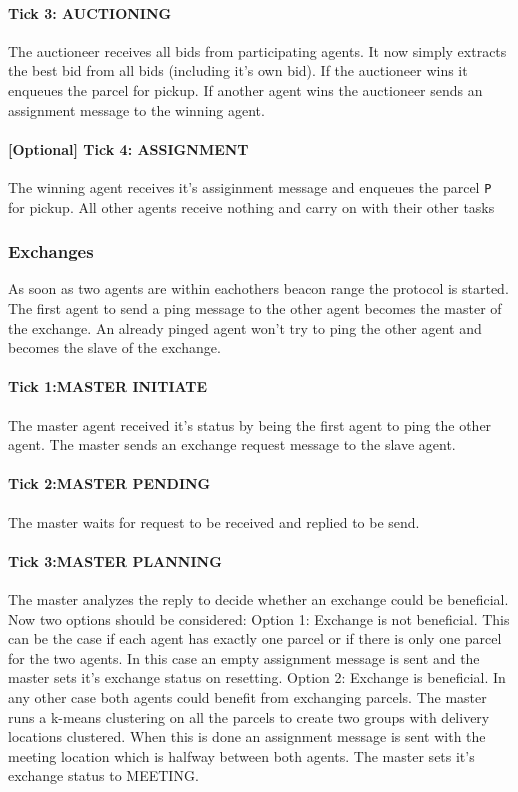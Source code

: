 \documentclass[../main.tex]{subfiles}
\begin{document}
\paragraph{Tick 3: AUCTIONING}
The auctioneer receives all bids from participating agents.
It now simply extracts the best bid from all bids (including it's own bid).
If the auctioneer wins it enqueues the parcel for pickup.
If another agent wins the auctioneer sends an assignment message to the winning agent.
\paragraph{[Optional] Tick 4: ASSIGNMENT}
The winning agent receives it's assiginment message and enqueues the parcel \texttt{P} for pickup.
All other agents receive nothing and carry on with their other tasks

\subsubsection{Exchanges}

As soon as two agents are within eachothers beacon range the protocol is started.
The first agent to send a ping message to the other agent becomes the master of the exchange.
An already pinged agent won't try to ping the other agent and becomes the slave of the exchange.

\paragraph{Tick 1:MASTER INITIATE}
The master agent received it's status by being the first agent to ping the other agent.
The master sends an exchange request message to the slave agent.
\paragraph{Tick 2:MASTER PENDING}
The master waits for request to be received and replied to be send.
\paragraph{Tick 3:MASTER PLANNING}
The master analyzes the reply to decide whether an exchange could be beneficial.
Now two options should be considered:
Option 1: Exchange is not beneficial.
This can be the case if each agent has exactly one parcel or if there is only one parcel for the two agents.
In this case an empty assignment message is sent and the master sets it's exchange status on resetting.
Option 2: Exchange is beneficial.
In any other case both agents could benefit from exchanging parcels.
The master runs a k-means clustering on all the parcels to create two groups with delivery locations clustered.
When this is done an assignment message is sent with the meeting location which is halfway between both agents.
The master sets it's exchange status to MEETING.
\end{document}
